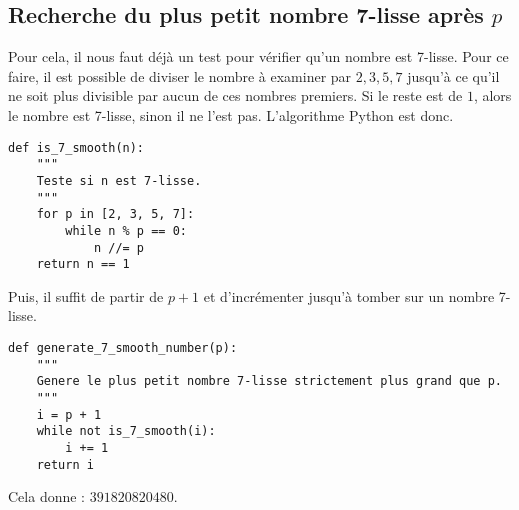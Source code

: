 \documentclass{article}
\begin{document}
\subsection{Recherche du plus petit nombre 7-lisse après $p$}

Pour cela, il nous faut déjà un test pour vérifier qu'un nombre est 7-lisse. Pour ce faire, il est possible de diviser le nombre à examiner par $2, 3, 5, 7$ jusqu'à ce qu'il ne soit plus divisible par aucun de ces nombres premiers. Si le reste est de $1$, alors le nombre est 7-lisse, sinon il ne l'est pas. L'algorithme Python est donc.

\begin{lstlisting}
def is_7_smooth(n):
    """
    Teste si n est 7-lisse.
    """
    for p in [2, 3, 5, 7]:
        while n % p == 0:
            n //= p
    return n == 1
\end{lstlisting}

Puis, il suffit de partir de $p + 1$ et d'incrémenter jusqu'à tomber sur un nombre 7-lisse.

\begin{lstlisting}
def generate_7_smooth_number(p):
    """
    Genere le plus petit nombre 7-lisse strictement plus grand que p.
    """
    i = p + 1
    while not is_7_smooth(i):
        i += 1
    return i
\end{lstlisting}

Cela donne : $391820820480$.
\end{document}
